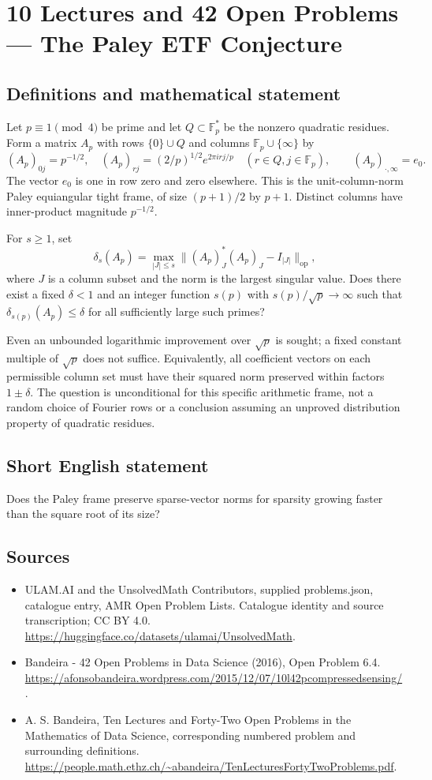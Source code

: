 \documentclass[11pt,a4paper]{article}
\begin{document}
\section*{10 Lectures and 42 Open Problems — The Paley ETF Conjecture}\label{statement}

\subsection{Definitions and mathematical statement}
Let $p\equiv1\pmod4$ be prime and let $Q\subset\mathbb F_p^*$ be
the nonzero quadratic residues. Form a matrix $A_p$ with rows
$\{0\}\cup Q$ and columns $\mathbb F_p\cup\{\infty\}$ by
\[
 (A_p)_{0j}=p^{-1/2},\quad
 (A_p)_{rj}=(2/p)^{1/2}e^{2\pi i rj/p}\quad(r\in Q,j\in\mathbb F_p),
 \qquad (A_p)_{\cdot,\infty}=e_0.
\]
The vector $e_0$ is one in row zero and zero elsewhere. This is the
unit-column-norm Paley equiangular tight frame, of size
$(p+1)/2$ by $p+1$. Distinct columns have inner-product magnitude
$p^{-1/2}$.

For $s\ge1$, set
\[
 \delta_s(A_p)=\max_{|J|\le s}
                 \|(A_p)_J^*(A_p)_J-I_{|J|}\|_{\mathrm{op}},
\]
where $J$ is a column subset and the norm is the largest singular
value. Does there exist a fixed $\delta<1$ and an integer function
$s(p)$ with $s(p)/\sqrt p\to\infty$ such that
$\delta_{s(p)}(A_p)\le\delta$ for all sufficiently large such primes?

Even an unbounded logarithmic improvement over $\sqrt p$ is sought;
a fixed constant multiple of $\sqrt p$ does not suffice. Equivalently,
all coefficient vectors on each permissible column set must have their
squared norm preserved within factors $1\pm\delta$. The question is
unconditional for this specific arithmetic frame, not a random choice
of Fourier rows or a conclusion assuming an unproved distribution
property of quadratic residues.
\subsection{Short English statement}
Does the Paley frame preserve sparse-vector norms for sparsity growing faster than the square root of its size?
\subsection{Sources}
\begin{itemize}
\item[S1] ULAM.AI and the UnsolvedMath Contributors, supplied problems.json, catalogue entry, AMR Open Problem Lists. Catalogue identity and source transcription; CC BY 4.0.
\url{https://huggingface.co/datasets/ulamai/UnsolvedMath}.
\item[S2] Bandeira - 42 Open Problems in Data Science (2016), Open Problem 6.4. 
\url{https://afonsobandeira.wordpress.com/2015/12/07/10l42pcompressedsensing/}.
\item[S3] A. S. Bandeira, Ten Lectures and Forty-Two Open Problems in the Mathematics of Data Science, corresponding numbered problem and surrounding definitions.
\url{https://people.math.ethz.ch/~abandeira/TenLecturesFortyTwoProblems.pdf}.
\end{itemize}
\end{document}
